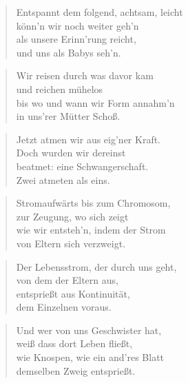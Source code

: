 \documentclass[10pt,a4paper]{article}
\begin{document}
\begin{multicols}{2}
\begin{verse}
Entspannt dem folgend, achtsam, leicht \\
könn’n wir noch weiter geh’n \\
als unsere Erinn’rung reicht, \\
und uns als Babys seh’n. \\
\end{verse}

\begin{verse}
Wir reisen durch was davor kam \\
und reichen mühelos \\
bis wo und wann wir Form annahm’n \\
in uns’rer Mütter Schoß. \\
\end{verse}

\begin{verse}
Jetzt atmen wir aus eig’ner Kraft. \\
Doch wurden wir dereinst \\
beatmet: eine Schwangerschaft. \\
Zwei atmeten als eins. \\
\end{verse}

\begin{verse}
Stromaufwärts bis zum Chromosom, \\
zur Zeugung, wo sich zeigt \\
wie wir entsteh’n, indem der Strom \\
von Eltern sich verzweigt. \\
\end{verse}

\begin{verse}
Der Lebensstrom, der durch uns geht, \\
von dem der Eltern aus, \\
entsprießt aus Kontinuität, \\
dem Einzelnen voraus. \\
\end{verse}

\begin{verse}
Und wer von uns Geschwister hat, \\
weiß dass dort Leben fließt, \\
wie Knospen, wie ein and’res Blatt \\
demselben Zweig entsprießt. \\
\end{verse}


\end{multicols}
\end{document}
